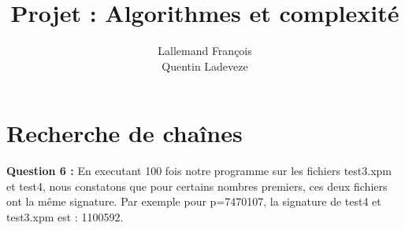 \documentclass[a4paper, 11pt]{article}
\title{Projet : Algorithmes et complexité}
\author{Lallemand François\\Quentin Ladeveze}
\begin{document}
\maketitle


\section{Recherche de chaînes}
\textbf{Question 6 : }
En executant 100 fois notre programme sur les fichiers test3.xpm et test4, nous constatons que pour certains nombres premiers, ces deux fichiers ont la même signature. Par exemple pour p=7470107, la signature de test4 et test3.xpm est : 1100592.
\end{document}
